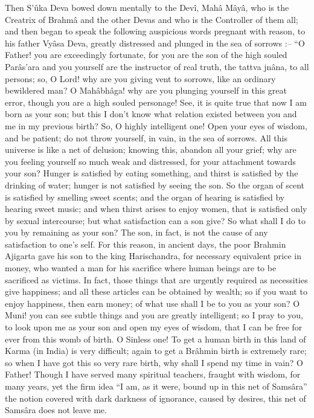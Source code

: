  

Then S’ûka Deva bowed down mentally to the Devî, Mahâ Mâyâ, who is the Creatrix of Brahmâ and the other Devas and who is the Controller of them all; and then began to speak the following auspicious words pregnant with reason, to his father Vyâsa Deva, greatly distressed and plunged in the sea of sorrows :-- “O Father! you are exceedingly fortunate, for you are the son of the high souled Parâs'ara and you yourself are the instructor of real truth, the tattva jnâna, to all persons; so, O Lord! why are you giving vent to sorrows, like an ordinary bewildered man? O Mahâbhâga! why are you plunging yourself in this great error, though you are a high souled personage! See, it is quite true that now I am born as your son; but this I don't know what relation existed between you and me in my previous birth? So, O highly intelligent one! Open your eyes of wisdom, and be patient; do not throw yourself, in vain, in the sea of sorrows. All this universe is like a net of delusion; knowing this, abandon all your grief; why are you feeling yourself so much weak and distressed, for your attachment towards your son? Hunger is satisfied by eating something, and thirst is satisfied by the drinking of water; hunger is not satisfied by seeing the son. So the organ of scent is satisfied by smelling sweet scents; and the organ of hearing is satisfied by hearing sweet music; and when thirst arises to enjoy women, that is satisfied only by sexual intercourse; but what satisfaction can a son give? So what shall I do to you by remaining as your son? The son, in fact, is not the cause of any satisfaction to one's self. For this reason, in ancient days, the poor Brahmin Ajigarta gave his son to the king Harischandra, for necessary equivalent price in money, who wanted a man for his sacrifice where human beings are to be sacrificed as victims. In fact, those things that are urgently required as necessities give happiness; and all these articles can be obtained by wealth; so if you want to enjoy happiness, then earn money; of what use shall I be to you as your son? O Muni! you can see subtle things and you are greatly intelligent; so I pray to you, to look upon me as your son and open my eyes of wisdom, that I can be free for ever from this womb of birth. O Sinless one! To get a human birth in this land of Karma (in India) is very difficult; again to get a Brâhmin birth is extremely rare; so when I have got this so very rare birth, why shall I spend my time in vain? O Father! Though I have served many spiritual teachers, fraught with wisdom, for many years, yet the firm idea “I am, as it were, bound up in this net of Samsâra” the notion covered with dark darkness of ignorance, caused by desires, this net of Samsâra does not leave me.

